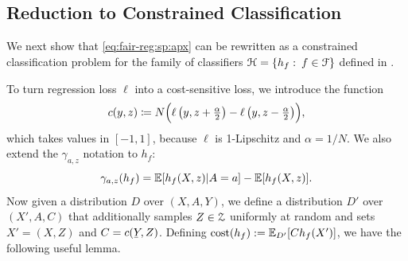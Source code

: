 \documentclass{article}
\begin{document}

\subsection{Reduction to Constrained Classification}

We next show that \eqref{eq:fair-reg:sp:apx} can be rewritten as a constrained classification
problem for the family of classifiers $\mathcal{H}=\{h_f:\:f\in\mathcal{F}\}$ defined
in .

To turn regression loss $\ell$ into a cost-sensitive loss, we introduce the function
%
\begin{equation}
c(y,z)\coloneqq N\Bigl(\ell\left(y,z+\tfrac{\alpha}{2}\right)-\ell\left(y,z-\tfrac{\alpha}{2}\right)\Bigr),
\label{eqn:costs}
\end{equation}
%
which takes values in $[-1,1]$, because $\ell$ is 1-Lipschitz and $\alpha=1/N$.
%
%
We also extend the $\gamma_{a,z}$ notation to $h_f$:
\[
  \gamma_{a,z}(h_f) = \mathbb{E}[h_f(X,z) | A = a] - \mathbb{E}[h_f(X,z)].
\]
%
Now given a distribution $D$ over $(X,A,Y)$, we define a distribution $D'$ over $(X',A,C)$ that additionally samples $Z \in \mathcal{Z}$ uniformly at random and sets $X' = (X,Z)$ and $C = c(\underY,Z)$. Defining $\textup{\mdseries cost}(h_f) := \mathbb{E}_{D'}[Ch_f(X')]$, we have the following useful lemma.
\end{document}
